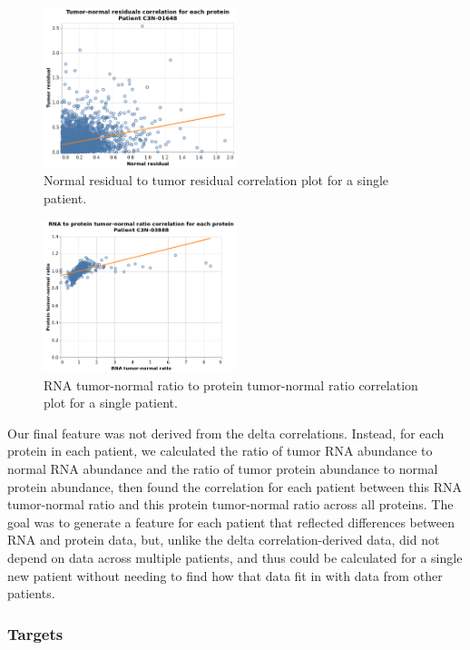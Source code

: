 \documentclass{article}
\begin{document}
\begin{figure}[H]
    \centering
    \includegraphics[width=0.5\textwidth]{tn_resid_corr}
    \caption{Normal residual to tumor residual correlation plot for a single patient.}
    \label{fig:tn_resid_corr}
\end{figure}

\begin{figure}[H]
    \centering
    \includegraphics[width=0.5\textwidth]{tn_ratio_corr}
    \caption{RNA tumor-normal ratio to protein tumor-normal ratio correlation plot for a single patient.}
    \label{fig:tn_ratio_corr}
\end{figure}

Our final feature was not derived from the delta correlations. Instead, for each protein in each patient, we calculated the ratio of tumor RNA abundance to normal RNA abundance and the ratio of tumor protein abundance to normal protein abundance, then found the correlation for each patient between this RNA tumor-normal ratio and this protein tumor-normal ratio across all proteins. The goal was to generate a feature for each patient that reflected differences between RNA and protein data, but, unlike the delta correlation-derived data, did not depend on data across multiple patients, and thus could be calculated for a single new patient without needing to find how that data fit in with data from other patients.

\subsubsection{Targets}
\end{document}
